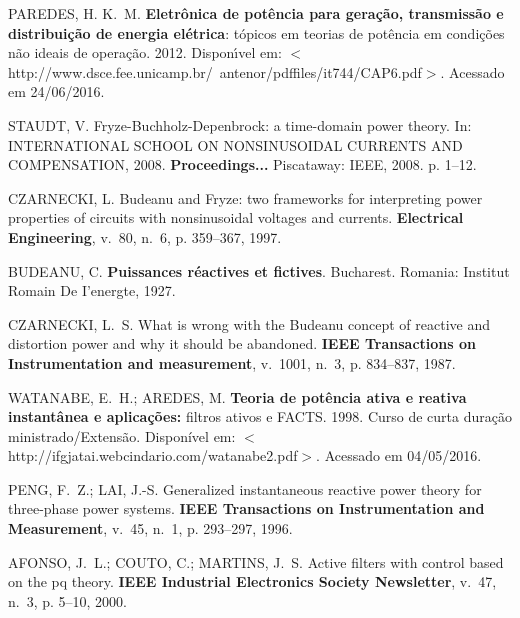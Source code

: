\begin{thebibliography}{}
{PAREDES, H. K.~M. \textbf{Eletr\^onica de pot\^encia para gera\c{c}\~ao,
  transmiss\~ao e distribui\c{c}\~ao de energia el\'etrica}: t\'opicos em
  teorias de pot\^encia em condi\c{c}\~oes n\~ao ideais de opera\c{c}\~ao. 2012.
  Dispon{\'\i}vel em:
  $<$http://www.dsce.fee.unicamp.br/~antenor/pdffiles/it744/CAP6.pdf$>$.}
  Acessado em 24/06/2016.

{STAUDT, V. Fryze-Buchholz-Depenbrock: a time-domain power theory. In:
	\uppercase{International School on Nonsinusoidal Currents and Compensation}, 2008.
	\textbf{Proceedings...} Piscataway: IEEE, 2008. p. 1--12.}

{CZARNECKI, L. Budeanu and Fryze: two frameworks for interpreting power
  properties of circuits with nonsinusoidal voltages and currents.
\textbf{Electrical Engineering}, v.~80, n.~6, p. 359--367, 1997.}

{BUDEANU, C. \textbf{Puissances r{\'e}actives et fictives}.
	Bucharest. Romania: Institut Romain De I'energte, 1927.}

{CZARNECKI, L.~S. What is wrong with the Budeanu concept of reactive and
  distortion power and why it should be abandoned.
\textbf{IEEE Transactions on Instrumentation and measurement}, v.~1001,
  n.~3, p. 834--837, 1987.}

{WATANABE, E.~H.; AREDES, M. \textbf{Teoria de pot\^encia ativa e reativa
  instant\^anea e aplica{\c{c}}{\~o}es:} filtros ativos e FACTS. 1998. 
  Curso de curta dura{\c{c}}{\~a}o ministrado/Extens{\~a}o. Dispon\'ivel em:
  $<$http://ifgjatai.webcindario.com/watanabe2.pdf$>$. 
  Acessado em 04/05/2016.}

{PENG, F.~Z.; LAI, J.-S. Generalized instantaneous reactive power theory for
  three-phase power systems.
\textbf{IEEE Transactions on Instrumentation and Measurement}, v.~45, n.~1,
  p. 293--297, 1996.}

{AFONSO, J.~L.; COUTO, C.; MARTINS, J.~S. Active filters with control based on
  the pq theory.
\textbf{IEEE Industrial Electronics Society Newsletter}, v.~47, n.~3, p.
  5--10, 2000.}


\end{thebibliography}
